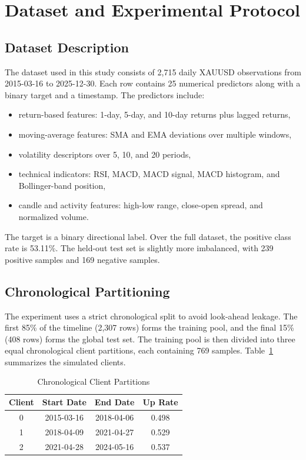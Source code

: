 \documentclass[conference]{IEEEtran}
\begin{document}
\section{Dataset and Experimental Protocol}
\subsection{Dataset Description}
The dataset used in this study consists of 2,715 daily XAUUSD observations from 2015-03-16 to 2025-12-30. Each row contains 25 numerical predictors along with a binary target and a timestamp. The predictors include:
\begin{itemize}
    \item return-based features: 1-day, 5-day, and 10-day returns plus lagged returns,
    \item moving-average features: SMA and EMA deviations over multiple windows,
    \item volatility descriptors over 5, 10, and 20 periods,
    \item technical indicators: RSI, MACD, MACD signal, MACD histogram, and Bollinger-band position,
    \item candle and activity features: high-low range, close-open spread, and normalized volume.
\end{itemize}

The target is a binary directional label. Over the full dataset, the positive class rate is 53.11\%. The held-out test set is slightly more imbalanced, with 239 positive samples and 169 negative samples.

\subsection{Chronological Partitioning}
The experiment uses a strict chronological split to avoid look-ahead leakage. The first 85\% of the timeline (2,307 rows) forms the training pool, and the final 15\% (408 rows) forms the global test set. The training pool is then divided into three equal chronological client partitions, each containing 769 samples. Table~\ref{tab:clients} summarizes the simulated clients.

\begin{table}[!t]
\caption{Chronological Client Partitions}
\label{tab:clients}
\centering
\begin{tabular}{c c c c}
\toprule
Client & Start Date & End Date & Up Rate \\
\midrule
0 & 2015-03-16 & 2018-04-06 & 0.498 \\
1 & 2018-04-09 & 2021-04-27 & 0.529 \\
2 & 2021-04-28 & 2024-05-16 & 0.537 \\
\bottomrule
\end{tabular}
\end{table}
\end{document}
